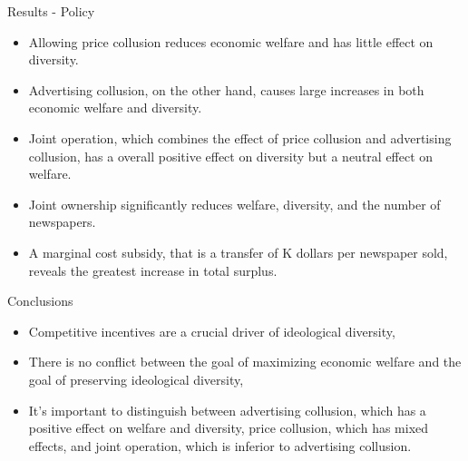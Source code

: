 \documentclass{beamer}
\begin{document}
\begin{frame}[t]{Results - Policy}
  \begin{itemize}
    \item Allowing price collusion reduces economic welfare and has little effect on
      diversity.
    \item Advertising collusion, on the other hand, causes large increases in both
      economic welfare and diversity.
    \item Joint operation, which combines the effect of price collusion and 
      advertising collusion, has a overall positive effect on diversity but a
      neutral effect on welfare.
    \item Joint ownership significantly reduces welfare, diversity, and the number
      of newspapers.
    \item A marginal cost subsidy, that is a transfer of K dollars per newspaper sold,
      reveals the greatest increase in total surplus.
  \end{itemize}
\end{frame}

\begin{frame}[t]{Conclusions}
  \begin{itemize}
    \item Competitive incentives are a crucial driver of ideological diversity,
    \item There is no conflict between the goal of maximizing economic welfare
      and the goal of preserving ideological diversity,
    \item It's important to distinguish between advertising collusion, which
      has a positive effect on welfare and diversity, price collusion, which has 
      mixed effects, and joint operation, which is inferior to advertising collusion.
  \end{itemize}
\end{frame}
\end{document}
